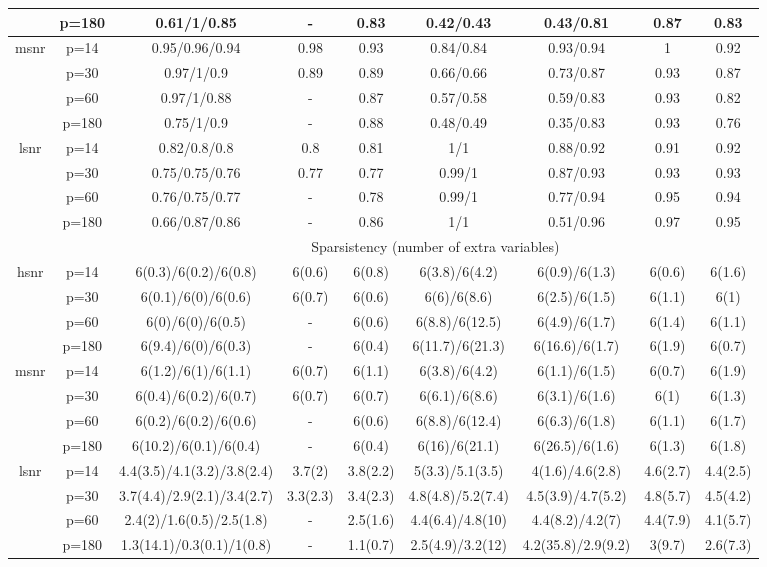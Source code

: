 \begin{table}[ht]
{\begin{tabular}{|c|c|ccccccc|}
   & p=180 & 0.61/1/0.85 & - & 0.83 & 0.42/0.43 & 0.43/0.81 & 0.87 & 0.83 \\ 
  \midrule\multirow{4}[2]{*}{msnr} & p=14 & 0.95/0.96/0.94 & 0.98 & 0.93 & 0.84/0.84 & 0.93/0.94 & 1 & 0.92 \\ 
   & p=30 & 0.97/1/0.9 & 0.89 & 0.89 & 0.66/0.66 & 0.73/0.87 & 0.93 & 0.87 \\ 
   & p=60 & 0.97/1/0.88 & - & 0.87 & 0.57/0.58 & 0.59/0.83 & 0.93 & 0.82 \\ 
   & p=180 & 0.75/1/0.9 & - & 0.88 & 0.48/0.49 & 0.35/0.83 & 0.93 & 0.76 \\ 
  \midrule\multirow{4}[2]{*}{lsnr} & p=14 & 0.82/0.8/0.8 & 0.8 & 0.81 & 1/1 & 0.88/0.92 & 0.91 & 0.92 \\ 
   & p=30 & 0.75/0.75/0.76 & 0.77 & 0.77 & 0.99/1 & 0.87/0.93 & 0.93 & 0.93 \\ 
   & p=60 & 0.76/0.75/0.77 & - & 0.78 & 0.99/1 & 0.77/0.94 & 0.95 & 0.94 \\ 
   & p=180 & 0.66/0.87/0.86 & - & 0.86 & 1/1 & 0.51/0.96 & 0.97 & 0.95 \\ 
   \midrule 
 \multicolumn{1}{|c}{} &       & \multicolumn{7}{c|}{Sparsistency (number of extra variables)} \\
\midrule\multirow{4}[2]{*}{hsnr} & p=14 & 6(0.3)/6(0.2)/6(0.8) & 6(0.6) & 6(0.8) & 6(3.8)/6(4.2) & 6(0.9)/6(1.3) & 6(0.6) & 6(1.6) \\ 
   & p=30 & 6(0.1)/6(0)/6(0.6) & 6(0.7) & 6(0.6) & 6(6)/6(8.6) & 6(2.5)/6(1.5) & 6(1.1) & 6(1) \\ 
   & p=60 & 6(0)/6(0)/6(0.5) & - & 6(0.6) & 6(8.8)/6(12.5) & 6(4.9)/6(1.7) & 6(1.4) & 6(1.1) \\ 
   & p=180 & 6(9.4)/6(0)/6(0.3) & - & 6(0.4) & 6(11.7)/6(21.3) & 6(16.6)/6(1.7) & 6(1.9) & 6(0.7) \\ 
  \midrule\multirow{4}[2]{*}{msnr} & p=14 & 6(1.2)/6(1)/6(1.1) & 6(0.7) & 6(1.1) & 6(3.8)/6(4.2) & 6(1.1)/6(1.5) & 6(0.7) & 6(1.9) \\ 
   & p=30 & 6(0.4)/6(0.2)/6(0.7) & 6(0.7) & 6(0.7) & 6(6.1)/6(8.6) & 6(3.1)/6(1.6) & 6(1) & 6(1.3) \\ 
   & p=60 & 6(0.2)/6(0.2)/6(0.6) & - & 6(0.6) & 6(8.8)/6(12.4) & 6(6.3)/6(1.8) & 6(1.1) & 6(1.7) \\ 
   & p=180 & 6(10.2)/6(0.1)/6(0.4) & - & 6(0.4) & 6(16)/6(21.1) & 6(26.5)/6(1.6) & 6(1.3) & 6(1.8) \\ 
  \midrule\multirow{4}[2]{*}{lsnr} & p=14 & 4.4(3.5)/4.1(3.2)/3.8(2.4) & 3.7(2) & 3.8(2.2) & 5(3.3)/5.1(3.5) & 4(1.6)/4.6(2.8) & 4.6(2.7) & 4.4(2.5) \\ 
   & p=30 & 3.7(4.4)/2.9(2.1)/3.4(2.7) & 3.3(2.3) & 3.4(2.3) & 4.8(4.8)/5.2(7.4) & 4.5(3.9)/4.7(5.2) & 4.8(5.7) & 4.5(4.2) \\ 
   & p=60 & 2.4(2)/1.6(0.5)/2.5(1.8) & - & 2.5(1.6) & 4.4(6.4)/4.8(10) & 4.4(8.2)/4.2(7) & 4.4(7.9) & 4.1(5.7) \\ 
   & p=180 & 1.3(14.1)/0.3(0.1)/1(0.8) & - & 1.1(0.7) & 2.5(4.9)/3.2(12) & 4.2(35.8)/2.9(9.2) & 3(9.7) & 2.6(7.3) \\ 
   \bottomrule 
\end{tabular}
}
\end{table}
